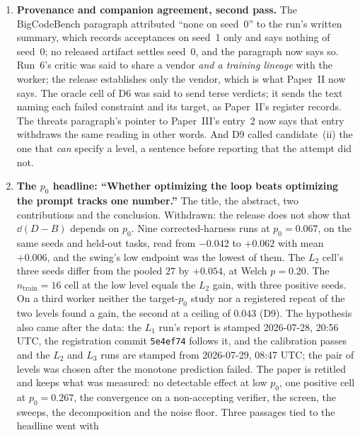 \documentclass[11pt]{article}
\begin{document}
\begin{enumerate}
    levels was chosen after the monotone prediction failed. The subtitle and the abstract now
    scope ``tracks'' to two levels on one worker, and the series note no longer says $p_0$
    \emph{decides} the answer.
  \item \textbf{Provenance and companion agreement, second pass.} The BigCodeBench paragraph
    attributed ``none on seed~0'' to the run's written summary, which records acceptances on
    seed~1 only and says nothing of seed~0; no released artifact settles seed~0, and the
    paragraph now says so. Run~6's critic was said to share a vendor \emph{and a training lineage}
    with the worker; the release establishes only the vendor, which is what Paper~II now says. The
    oracle cell of D6 was said to send terse verdicts; it sends the text naming each failed
    constraint and its target, as Paper~II's register records. The threats paragraph's pointer to
    Paper~III's entry~2 now says that entry withdraws the same reading in other words. And D9 called
    candidate~(ii) the one that \emph{can} specify a level, a sentence before reporting that the
    attempt did not.
  \item \textbf{The $p_0$ headline: ``Whether optimizing the loop beats optimizing the prompt
    tracks one number.''} The title, the abstract, two contributions and the conclusion.
    Withdrawn: the release does not show that $\dd(D-B)$ depends on $p_0$. Nine corrected-harness
    runs at $p_0 = 0.067$, on the same seeds and held-out tasks, read from $-0.042$ to $+0.062$
    with mean $+0.006$, and the swing's low endpoint was the lowest of them. The $L_2$ cell's
    three seeds differ from the pooled $27$ by $+0.054$, at Welch $p = 0.20$. The
    $n_{\mathrm{train}} = 16$ cell at the low level equals the $L_2$ gain, with three positive
    seeds. On a third worker neither the target-$p_0$ study nor a registered repeat of the two
    levels found a gain, the second at a ceiling of $0.043$ (D9). The hypothesis also came after
    the data: the $L_1$ run's report is stamped 2026-07-28, 20:56 UTC, the registration commit
    \texttt{5e4ef74} follows it, and the calibration passes and the $L_2$ and $L_3$ runs are stamped
    from 2026-07-29, 08:47 UTC; the pair of levels was chosen after the monotone prediction failed.
    The paper is retitled and keeps what was measured: no detectable effect at low $p_0$, one
    positive cell at $p_0 = 0.267$, the convergence on a non-accepting verifier, the screen, the
    sweeps, the decomposition and the noise floor. Three passages tied to the headline went with

\end{enumerate}
\end{document}

